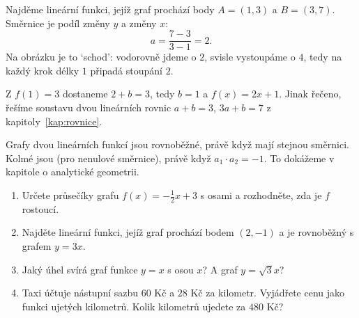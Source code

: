 \begin{example}\label{ex:primka-dvema-body}
  Najděme lineární funkci, jejíž graf prochází body $A = (1, 3)$ a $B = (3, 7)$. Směrnice je podíl změny $y$ a změny $x$:
  \begin{equation*}
    a = \frac{7 - 3}{3 - 1} = 2.
  \end{equation*}
  Na obrázku je to `schod': vodorovně jdeme o $2$, svisle vystoupáme o $4$, tedy na každý krok délky $1$ připadá stoupání $2$.
  \begin{center}
  \end{center}
  Z $f(1) = 3$ dostaneme $2 + b = 3$, tedy $b = 1$ a $f(x) = 2x + 1$. Jinak řečeno, řešíme soustavu dvou lineárních rovnic $a + b = 3$, $3a + b = 7$ z kapitoly~\ref{kap:rovnice}.
\end{example}

\begin{note}
  Grafy dvou lineárních funkcí jsou rovnoběžné, právě když mají stejnou směrnici. Kolmé jsou (pro nenulové směrnice), právě když $a_1\cdot a_2 = -1$. To dokážeme v kapitole o analytické geometrii.
\end{note}

\begin{problem}
  \begin{enumerate}[label=(\alph*)]
    \item Určete průsečíky grafu $f(x) = -\frac{1}{2}x + 3$ s osami a rozhodněte, zda je $f$ rostoucí.
    \item Najděte lineární funkci, jejíž graf prochází bodem $(2, -1)$ a je rovnoběžný s grafem $y = 3x$.
    \item Jaký úhel svírá graf funkce $y = x$ s osou $x$? A graf $y = \sqrt{3}x$?
    \item Taxi účtuje nástupní sazbu $60$ Kč a $28$ Kč za kilometr. Vyjádřete cenu jako funkci ujetých kilometrů. Kolik kilometrů ujedete za $480$ Kč?
  \end{enumerate}
\end{problem}


